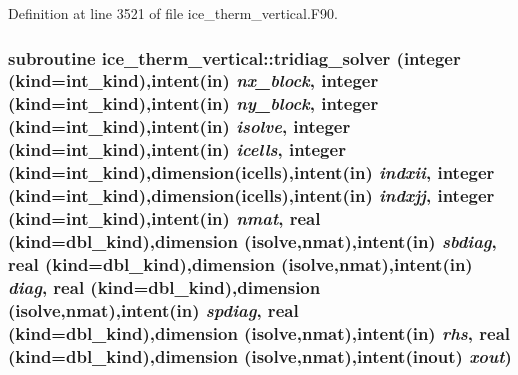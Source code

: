 Definition at line 3521 of file ice\_\-therm\_\-vertical.F90.\hypertarget{namespaceice__therm__vertical_aa5780ef62e3f9b27790b7ba6c47116a0}{
\subsubsection[{tridiag\_\-solver}]{\setlength{\rightskip}{0pt plus 5cm}subroutine ice\_\-therm\_\-vertical::tridiag\_\-solver (integer (kind=int\_\-kind),intent(in) {\em nx\_\-block}, \/  integer (kind=int\_\-kind),intent(in) {\em ny\_\-block}, \/  integer (kind=int\_\-kind),intent(in) {\em isolve}, \/  integer (kind=int\_\-kind),intent(in) {\em icells}, \/  integer (kind=int\_\-kind),dimension(icells),intent(in) {\em indxii}, \/  integer (kind=int\_\-kind),dimension(icells),intent(in) {\em indxjj}, \/  integer (kind=int\_\-kind),intent(in) {\em nmat}, \/  real (kind=dbl\_\-kind),dimension (isolve,nmat),intent(in) {\em sbdiag}, \/  real (kind=dbl\_\-kind),dimension (isolve,nmat),intent(in) {\em diag}, \/  real (kind=dbl\_\-kind),dimension (isolve,nmat),intent(in) {\em spdiag}, \/  real (kind=dbl\_\-kind),dimension (isolve,nmat),intent(in) {\em rhs}, \/  real (kind=dbl\_\-kind),dimension (isolve,nmat),intent(inout) {\em xout})}}
\label{namespaceice__therm__vertical_aa5780ef62e3f9b27790b7ba6c47116a0}


